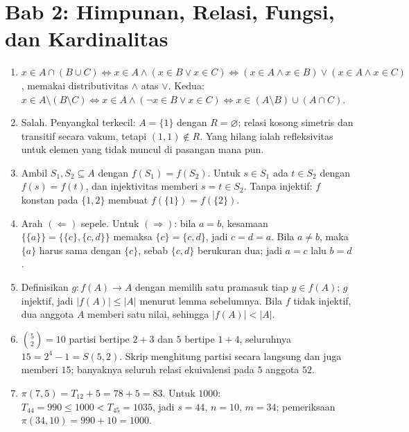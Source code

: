 \section*{Bab 2: Himpunan, Relasi, Fungsi, dan Kardinalitas}
\begin{enumerate}[label=\textbf{2.\arabic*}]
  \item $x\in A\cap(B\cup C)\iff x\in A\wedge(x\in B\vee x\in C)\iff
        (x\in A\wedge x\in B)\vee(x\in A\wedge x\in C)$, memakai distributivitas
        $\wedge$ atas $\vee$. Kedua: $x\in A\setminus(B\setminus C)\iff x\in
        A\wedge(\neg x\in B\vee x\in C)\iff x\in(A\setminus B)\cup(A\cap C)$.

  \item Salah. Penyangkal terkecil: $A=\{1\}$ dengan $R=\varnothing$; relasi kosong
        simetris dan transitif secara vakum, tetapi $(1,1)\notin R$. Yang hilang
        ialah refleksivitas untuk elemen yang tidak muncul di pasangan mana pun.

  \item Ambil $S_{1},S_{2}\subseteq A$ dengan $f(S_{1})=f(S_{2})$. Untuk $s\in S_{1}$
        ada $t\in S_{2}$ dengan $f(s)=f(t)$, dan injektivitas memberi $s=t\in S_{2}$.
        Tanpa injektif: $f$ konstan pada $\{1,2\}$ membuat $f(\{1\})=f(\{2\})$.

  \item Arah $(\Leftarrow)$ sepele. Untuk $(\Rightarrow)$: bila $a=b$, kesamaan
        $\{\{a\}\}=\{\{c\},\{c,d\}\}$ memaksa $\{c\}=\{c,d\}$, jadi $c=d=a$. Bila
        $a\ne b$, maka $\{a\}$ harus sama dengan $\{c\}$, sebab $\{c,d\}$ berukuran
        dua; jadi $a=c$ lalu $b=d$.

  \item Definisikan $g:f(A)\to A$ dengan memilih satu pramasuk tiap $y\in f(A)$;
        $g$ injektif, jadi $|f(A)|\le|A|$ menurut lemma sebelumnya. Bila $f$ tidak
        injektif, dua anggota $A$ memberi satu nilai, sehingga $|f(A)|<|A|$.

  \item $\binom{5}{2}=10$ partisi bertipe $2+3$ dan $5$ bertipe $1+4$, seluruhnya
        $15=2^{4}-1=S(5,2)$. Skrip menghitung partisi secara langsung dan juga
        memberi $15$; banyaknya seluruh relasi ekuivalensi pada $5$ anggota $52$.

  \item $\pi(7,5)=T_{12}+5=78+5=83$. Untuk $1000$: $T_{44}=990\le 1000<T_{45}=1035$,
        jadi $s=44$, $n=10$, $m=34$; pemeriksaan $\pi(34,10)=990+10=1000$.


\end{enumerate}
